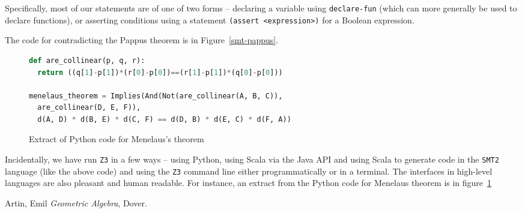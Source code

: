 \documentclass{amsart}
\theoremstyle{plain}
\theoremstyle{definition}
\theoremstyle{remark}
\begin{document}
Specifically, most of our statements are of one of two forms --
declaring a variable using \texttt{declare-fun} (which can more
generally be used to declare functions), or asserting conditions using a
statement \texttt{(assert\ <expression>)} for a
Boolean expression.

The code for contradicting the Pappus theorem is in Figure~\ref{smt-pappus}.
{\small
\begin{figure}
\begin{lstlisting}[language=Python, frame=single]
def are_collinear(p, q, r):
  return ((q[1]-p[1])*(r[0]-p[0])==(r[1]-p[1])*(q[0]-p[0]))

menelaus_theorem = Implies(And(Not(are_collinear(A, B, C)), 
  are_collinear(D, E, F)), 
  d(A, D) * d(B, E) * d(C, F) == d(D, B) * d(E, C) * d(F, A))
\end{lstlisting}
\caption{Extract of Python code for Menelaus's theorem}\label{python-menelaus}
\end{figure}
}

Incidentally, we have run \texttt{Z3} in a few ways -- using Python, using Scala
via the Java API and using Scala to generate code in the \texttt{SMT2} language
(like the above code) and using the \texttt{Z3} command line either
programmatically or in a terminal. The interfaces in high-level
languages are also pleasant and human readable. For instance, an extract
from the Python code for Menelaus theorem is in figure~\ref{python-menelaus}



\begin{thebibliography}{10}

	 Artin, Emil
	\textit{Geometric Algebra},
	Dover.

\end{thebibliography} 
\end{document}
